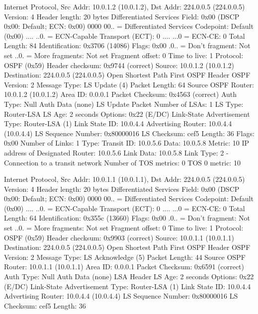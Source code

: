 \documentclass[a4paper, 11pt]{article}
\begin{document}
Internet Protocol, Src Addr: 10.0.1.2 (10.0.1.2), Dst Addr: 224.0.0.5 (224.0.0.5)
    Version: 4
    Header length: 20 bytes
    Differentiated Services Field: 0x00 (DSCP 0x00: Default; ECN: 0x00)
        0000 00.. = Differentiated Services Codepoint: Default (0x00)
        .... ..0. = ECN-Capable Transport (ECT): 0
        .... ...0 = ECN-CE: 0
    Total Length: 84
    Identification: 0x3706 (14086)
    Flags: 0x00
        .0.. = Don't fragment: Not set
        ..0. = More fragments: Not set
    Fragment offset: 0
    Time to live: 1
    Protocol: OSPF (0x59)
    Header checksum: 0x9744 (correct)
    Source: 10.0.1.2 (10.0.1.2)
    Destination: 224.0.0.5 (224.0.0.5)
Open Shortest Path First
    OSPF Header
        OSPF Version: 2
        Message Type: LS Update (4)
        Packet Length: 64
        Source OSPF Router: 10.0.1.2 (10.0.1.2)
        Area ID: 0.0.0.1
        Packet Checksum: 0x4563 (correct)
        Auth Type: Null
        Auth Data (none)
    LS Update Packet
        Number of LSAs: 1
        LS Type: Router-LSA
            LS Age: 2 seconds
            Options: 0x22 (E/DC)
            Link-State Advertisement Type: Router-LSA (1)
            Link State ID: 10.0.4.4
            Advertising Router: 10.0.4.4 (10.0.4.4)
            LS Sequence Number: 0x80000016
            LS Checksum: cef5
            Length: 36
            Flags: 0x00
            Number of Links: 1
            Type: Transit  ID: 10.0.5.6        Data: 10.0.5.8        Metric: 10
                IP address of Designated Router: 10.0.5.6
                Link Data: 10.0.5.8
                Link Type: 2 - Connection to a transit network
                Number of TOS metrics: 0
                TOS 0 metric: 10



Internet Protocol, Src Addr: 10.0.1.1 (10.0.1.1), Dst Addr: 224.0.0.5 (224.0.0.5)
    Version: 4
    Header length: 20 bytes
    Differentiated Services Field: 0x00 (DSCP 0x00: Default; ECN: 0x00)
        0000 00.. = Differentiated Services Codepoint: Default (0x00)
        .... ..0. = ECN-Capable Transport (ECT): 0
        .... ...0 = ECN-CE: 0
    Total Length: 64
    Identification: 0x355c (13660)
    Flags: 0x00
        .0.. = Don't fragment: Not set
        ..0. = More fragments: Not set
    Fragment offset: 0
    Time to live: 1
    Protocol: OSPF (0x59)
    Header checksum: 0x9903 (correct)
    Source: 10.0.1.1 (10.0.1.1)
    Destination: 224.0.0.5 (224.0.0.5)
Open Shortest Path First
    OSPF Header
        OSPF Version: 2
        Message Type: LS Acknowledge (5)
        Packet Length: 44
        Source OSPF Router: 10.0.1.1 (10.0.1.1)
        Area ID: 0.0.0.1
        Packet Checksum: 0x6591 (correct)
        Auth Type: Null
        Auth Data (none)
    LSA Header
        LS Age: 2 seconds
        Options: 0x22 (E/DC)
        Link-State Advertisement Type: Router-LSA (1)
        Link State ID: 10.0.4.4
        Advertising Router: 10.0.4.4 (10.0.4.4)
        LS Sequence Number: 0x80000016
        LS Checksum: cef5
        Length: 36
\end{document}
